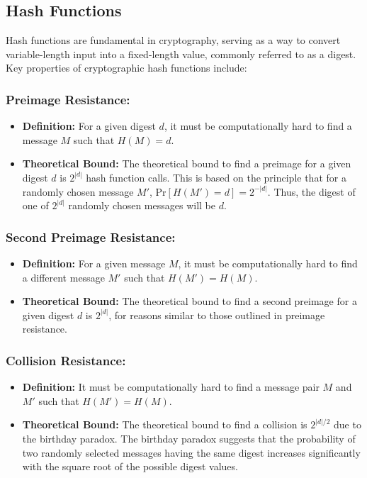 \documentclass[12pt]{article}
\begin{document}
\subsection*{Hash Functions}

Hash functions are fundamental in cryptography, serving as a way to convert variable-length input into a fixed-length value, commonly referred to as a digest. Key properties of cryptographic hash functions include:

\subsubsection*{Preimage Resistance:}
\begin{itemize}
    \item \textbf{Definition:} For a given digest \( d \), it must be computationally hard to find a message \( M \) such that \( H(M) = d \).
    \item \textbf{Theoretical Bound:} The theoretical bound to find a preimage for a given digest \( d \) is \( 2^{|d|} \) hash function calls. This is based on the principle that for a randomly chosen message \( M' \), \( \text{Pr}[H(M')=d]=2^{-|d|} \). Thus, the digest of one of \( 2^{|d|} \) randomly chosen messages will be \( d \).
\end{itemize}

\subsubsection*{Second Preimage Resistance:}
\begin{itemize}
    \item \textbf{Definition:} For a given message \( M \), it must be computationally hard to find a different message \( M' \) such that \( H(M')=H(M) \).
    \item \textbf{Theoretical Bound:} The theoretical bound to find a second preimage for a given digest \( d \) is \( 2^{|d|} \), for reasons similar to those outlined in preimage resistance.
\end{itemize}

\subsubsection*{Collision Resistance:}
\begin{itemize}
    \item \textbf{Definition:} It must be computationally hard to find a message pair \( M \) and \( M' \) such that \( H(M')=H(M) \).
    \item \textbf{Theoretical Bound:} The theoretical bound to find a collision is \( 2^{|d|/2} \) due to the birthday paradox. The birthday paradox suggests that the probability of two randomly selected messages having the same digest increases significantly with the square root of the possible digest values.
\end{itemize}
\end{document}
